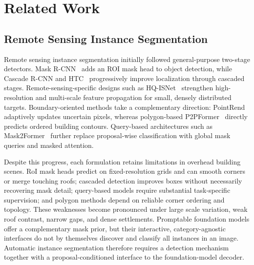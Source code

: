 \documentclass[letterpaper,journal]{IEEEtran}
\begin{document}
\clearpage

\section{Related Work}
\label{sec:related}

\subsection{Remote Sensing Instance Segmentation}
Remote sensing instance segmentation initially followed general-purpose two-stage detectors. Mask R-CNN~\cite{ref_maskrcnn} adds an ROI mask head to object detection, while Cascade R-CNN and HTC~\cite{ref_cascade,ref_htc} progressively improve localization through cascaded stages. Remote-sensing-specific designs such as HQ-ISNet~\cite{ref_hqisnet} strengthen high-resolution and multi-scale feature propagation for small, densely distributed targets. Boundary-oriented methods take a complementary direction: PointRend~\cite{ref_pointrend} adaptively updates uncertain pixels, whereas polygon-based P2PFormer~\cite{ref_p2pformer} directly predicts ordered building contours. Query-based architectures such as Mask2Former~\cite{ref_mask2former} further replace proposal-wise classification with global mask queries and masked attention.

Despite this progress, each formulation retains limitations in overhead building scenes. RoI mask heads predict on fixed-resolution grids and can smooth corners or merge touching roofs; cascaded detection improves boxes without necessarily recovering mask detail; query-based models require substantial task-specific supervision; and polygon methods depend on reliable corner ordering and topology. These weaknesses become pronounced under large scale variation, weak roof contrast, narrow gaps, and dense settlements. Promptable foundation models offer a complementary mask prior, but their interactive, category-agnostic interfaces do not by themselves discover and classify all instances in an image. Automatic instance segmentation therefore requires a detection mechanism together with a proposal-conditioned interface to the foundation-model decoder.
\end{document}
